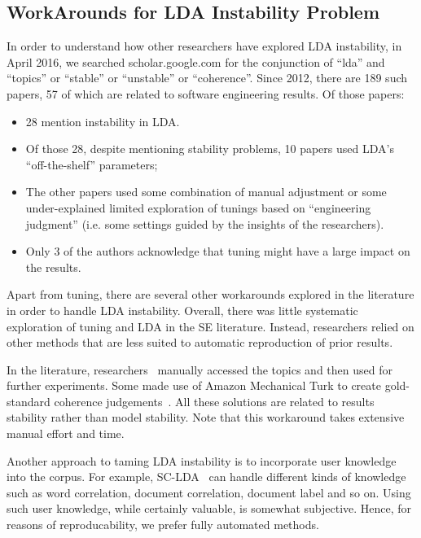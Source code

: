 \documentclass[10pt,conference]{IEEEtran}
\newcommand{\bi}{\begin{itemize}}
\newcommand{\ei}{\end{itemize}}
\theoremstyle{break}
\begin{document}
\subsection{WorkArounds for LDA Instability Problem}
\label{sect: solutions}
In order to understand how other researchers have explored LDA instability,
in April 2016, we searched scholar.google.com for the conjunction of “lda” and “topics” or “stable” or
“unstable” or “coherence”. Since 2012, there are  189 such papers, 57
of which are related to software engineering results. Of those papers:
\bi
\item 28
mention instability in LDA. %
\item Of those 28, despite mentioning stability problems,
  10 papers used LDA's ``off-the-shelf'' parameters;
  \item The  other papers used some combination of manual adjustment or some
under-explained limited exploration of tunings based on ``engineering judgment''
(i.e. some settings guided by the insights of the researchers).
\item
Only 3 of the authors acknowledge that tuning might have a large impact
on the results.
\ei
Apart from tuning, there are several other workarounds explored in the literature
in order to handle LDA instability. Overall, there was little systematic exploration of tuning and LDA in the SE literature.
Instead, researchers relied on other methods that are less suited to automatic reproduction of prior results.

In the literature, researchers~\cite{maskeri2008mining, martin2015app, guzman2014users}
    manually accessed the topics and then used for further experiments. Some
    made use of Amazon Mechanical Turk to create gold-standard coherence
    judgements~\cite{lau2014machine}. All these solutions are related to results
    stability rather than model stability.
    Note that this workaround takes extensive manual effort and time.

    
    Another approach to taming LDA instability
    is to incorporate
    user knowledge into the corpus. For example,
    SC-LDA~\cite{yang2015improving} can
    handle different kinds of knowledge such as word correlation,
    document correlation, document label and so on. Using such user
    knowledge, while certainly valuable, is somewhat subjective.
    Hence, for reasons of reproducability, we prefer fully
    automated methods.
\end{document}
